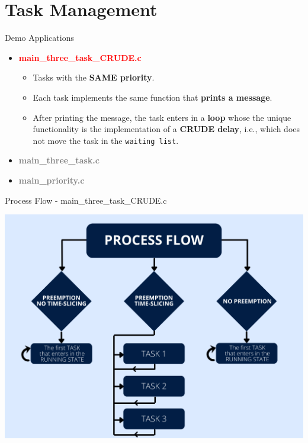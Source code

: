 \documentclass{beamer}
\begin{document}
\section{Task Management}
\begin{frame}{Demo Applications}
    \begin{itemize}
        \item \textcolor{red}{\textbf{main\_three\_task\_CRUDE.c}}
        \begin{itemize}
            \item Tasks with the \textbf{SAME priority}.
            \item Each task implements the same function that \textbf{prints a message}.
            \item After printing the message, the task enters in a \textbf{loop} whose the unique functionality is the implementation of a \textbf{CRUDE delay}, i.e., which does not move the task in the \texttt{waiting list}.
        \end{itemize}
        \item \textcolor{gray}{\textbf{main\_three\_task.c}}
        \item \textcolor{gray}{\textbf{main\_priority.c}}
    \end{itemize}
\end{frame}

\begin{frame}{Process Flow - main\_three\_task\_CRUDE.c}

\vfill
\centering
\includegraphics[width=0.65\linewidth]{img/three_tasks_CRUDE.png} 
\vfill
    
\end{frame}
\end{document}
